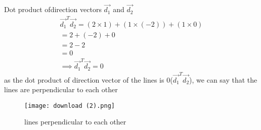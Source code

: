 \documentclass[journal,12pt,twocolumn]{IEEEtran}
\begin{document}
Dot product ofdirection vectors  $\vec{d_1}$ and $\vec{d_2}$
\begin{align}
\vec{d_1}^T\vec{d_2}=(2 \times 1) +(1 \times (-2)) +(1 \times 0) 
\\
=2+(-2) +0
\\
=2-2
\\
=0
\\
\implies \boxed{\vec{d_1}^T\vec{d_2}=0}
\end{align}
as the dot product of direction vector of the lines is 0($\vec{d_1}^T\vec{d_2}$), we can say that the lines are perpendicular to each other
\begin{figure}[ht]
\centering
\texttt{[image: download (2).png]}
\caption{lines perpendicular to each other}
\label{Plot of the line}
\end{figure}
\end{document}
